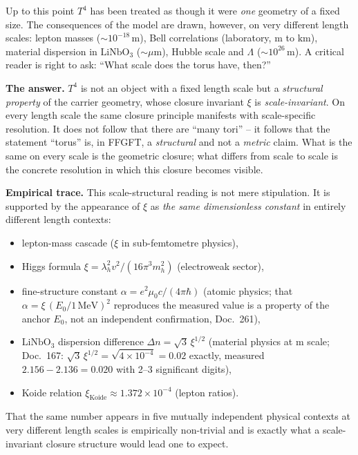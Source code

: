 Up to this point $T^4$ has been treated as though it were \emph{one}
geometry of a fixed size. The consequences of the model are drawn,
however, on very different length scales: lepton masses
($\sim 10^{-18}\,\mathrm{m}$), Bell correlations (laboratory,
$\mathrm{m}$ to $\mathrm{km}$), material dispersion in
$\mathrm{LiNbO}_3$ ($\sim \mu\mathrm{m}$), Hubble scale and
$\Lambda$ ($\sim 10^{26}\,\mathrm{m}$). A critical reader is right to
ask: ``What scale does the torus have, then?''

\textbf{The answer.} $T^4$ is not an object with a fixed length
scale but a \emph{structural property} of the carrier geometry,
whose closure invariant $\xi$ is \emph{scale-invariant}. On every
length scale the same closure principle manifests with
scale-specific resolution. It does not follow that there are
``many tori'' -- it follows that the statement ``torus'' is, in
FFGFT, a \emph{structural} and not a \emph{metric} claim. What is
the same on every scale is the geometric closure; what differs from
scale to scale is the concrete resolution in which this closure
becomes visible.

\textbf{Empirical trace.} This scale-structural reading is not mere
stipulation. It is supported by the appearance of $\xi$ as
\emph{the same dimensionless constant} in entirely different
length contexts:

\begin{itemize}[leftmargin=2em,itemsep=2pt,topsep=2pt]
  \item lepton-mass cascade ($\xi$ in sub-femtometre physics),
  \item Higgs formula $\xi = \lambda_h^2 v^2 / (16\pi^3 m_h^2)$
        (electroweak sector),
  \item fine-structure constant $\alpha = e^2 \mu_0 c / (4\pi\hbar)$
        (atomic physics; that $\alpha=\xi\,(E_0/1\,\mathrm{MeV})^2$
        reproduces the measured value is a property of the anchor $E_0$,
        not an independent confirmation, Doc.~261),
  \item $\mathrm{LiNbO}_3$ dispersion difference
        $\Delta n = \sqrt{3}\,\xi^{1/2}$ (material physics at
        \textmu m scale; Doc.~167: $\sqrt{3}\,\xi^{1/2}=\sqrt{4\times10^{-4}}=0.02$ exactly,
        measured $2.156-2.136=0.020$ with 2--3 significant digits),
  \item Koide relation $\xi_{\text{Koide}} \approx 1.372 \times
        10^{-4}$ (lepton ratios).
\end{itemize}

That the same number appears in five mutually independent physical
contexts at very different length scales is empirically non-trivial
and is exactly what a scale-invariant closure structure would lead
one to expect.

